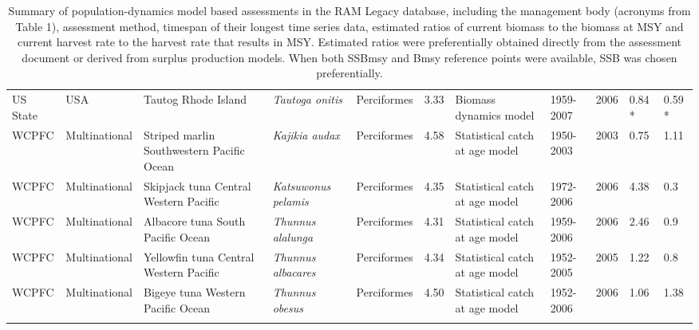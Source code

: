 \begin{longtable}{p{1.5cm}p{1.5cm}p{3cm}p{3cm}p{2.5cm}p{0.9cm}p{1.4cm}p{0.9cm}p{0.9cm}p{0.9cm}p{1cm}}
  US State & USA & Tautog Rhode Island & \textit{Tautoga onitis} & Perciformes & 3.33 & Biomass dynamics model & 1959-2007 & 2006 & 0.84 * & 0.59 * \\ 
  WCPFC & Multinational & Striped marlin Southwestern Pacific Ocean & \textit{Kajikia audax} & Perciformes & 4.58 & Statistical catch at age model & 1950-2003 & 2003 & 0.75 & 1.11 \\ 
  WCPFC & Multinational & Skipjack tuna Central Western Pacific & \textit{Katsuwonus pelamis} & Perciformes & 4.35 & Statistical catch at age model & 1972-2006 & 2006 & 4.38 & 0.3 \\ 
  WCPFC & Multinational & Albacore tuna South Pacific Ocean & \textit{Thunnus alalunga} & Perciformes & 4.31 & Statistical catch at age model & 1959-2006 & 2006 & 2.46 & 0.9 \\ 
  WCPFC & Multinational & Yellowfin tuna Central Western Pacific & \textit{Thunnus albacares} & Perciformes & 4.34 & Statistical catch at age model & 1952-2005 & 2005 & 1.22 & 0.8 \\ 
  WCPFC & Multinational & Bigeye tuna Western Pacific Ocean & \textit{Thunnus obesus} & Perciformes & 4.50 & Statistical catch at age model & 1952-2006 & 2006 & 1.06 & 1.38 \\ 
   \hline
\hline
\caption{Summary of population-dynamics model based assessments in the RAM Legacy database, including the management body (acronyms from Table 1), assessment method, timespan of their longest time series data, estimated ratios of current biomass to the biomass at MSY and current harvest rate to the harvest rate that results in MSY. Estimated ratios were preferentially obtained directly from the assessment document or derived from surplus production models. When both SSBmsy and Bmsy reference points were available, SSB was chosen preferentially.}
\label{tab:crosshair}
\end{longtable}
